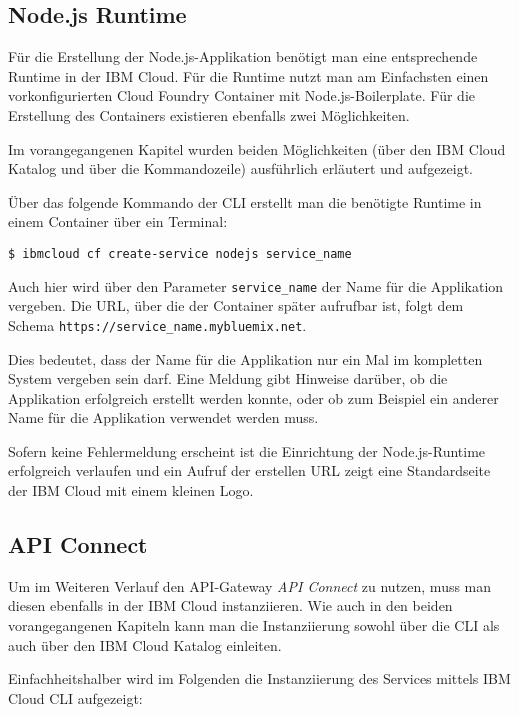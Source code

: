 \subsection{Node.js Runtime}
\label{ssc:nodejs_runtime}
Für die Erstellung der Node.js-Applikation benötigt man eine entsprechende Runtime in der IBM Cloud. Für die Runtime
nutzt man am Einfachsten einen vorkonfigurierten Cloud Foundry Container mit Node.js-Boilerplate. Für die Erstellung
des Containers existieren ebenfalls zwei Möglichkeiten.

Im vorangegangenen Kapitel wurden beiden Möglichkeiten (über den IBM Cloud Katalog und über die Kommandozeile)
ausführlich erläutert und aufgezeigt.

Über das folgende Kommando der CLI erstellt man die benötigte Runtime in einem Container über ein Terminal:

\begin{lstlisting}[caption=Instanziierung der Node.js Runtime, label=ls:vorbereitung_nodejstensorflow]
    $ ibmcloud cf create-service nodejs service_name
\end{lstlisting}

Auch hier wird über den Parameter \texttt{service\_name} der Name für die Applikation vergeben. Die URL, über die der
Container später aufrufbar ist, folgt dem Schema \texttt{https://service\_name.mybluemix.net}.

Dies bedeutet, dass der Name für die Applikation nur ein Mal im kompletten System vergeben sein darf. Eine Meldung gibt
Hinweise darüber, ob die Applikation erfolgreich erstellt werden konnte, oder ob zum Beispiel ein anderer Name für die
Applikation verwendet werden muss.

Sofern keine Fehlermeldung erscheint ist die Einrichtung der Node.js-Runtime erfolgreich verlaufen und ein Aufruf der
erstellen URL zeigt eine Standardseite der IBM Cloud mit einem kleinen Logo.

\subsection{API Connect}
\label{subsec:vorbereitung_apiconnect}
Um im Weiteren Verlauf den API-Gateway \textit{API Connect} zu nutzen, muss man diesen ebenfalls in der IBM Cloud
instanziieren. Wie auch in den beiden vorangegangenen Kapiteln kann man die Instanziierung sowohl über die CLI als auch
über den IBM Cloud Katalog einleiten.

Einfachheitshalber wird im Folgenden die Instanziierung des Services mittels IBM Cloud CLI aufgezeigt:

